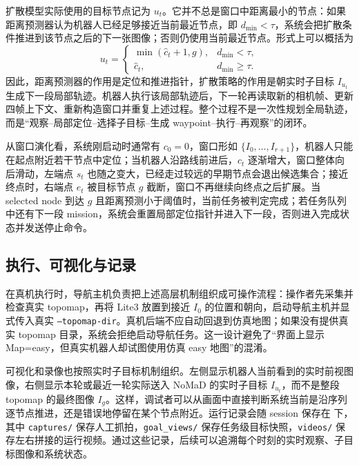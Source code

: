 扩散模型实际使用的目标节点记为 $u_t$。它并不总是窗口中距离最小的节点：如果距离预测器认为机器人已经足够接近当前最近节点，即 $d_{\min}<\tau$，系统会把扩散条件推进到该节点之后的下一张图像；否则仍使用当前最近节点。形式上可以概括为
\begin{equation}
u_t=
\begin{cases}
\min(\hat{c}_t+1,g), & d_{\min}<\tau,\\
\hat{c}_t, & d_{\min}\ge \tau.
\end{cases}
\end{equation}
因此，距离预测器的作用是定位和推进指针，扩散策略的作用是朝实时子目标 $I_{u_t}$ 生成下一段局部轨迹。机器人执行该局部轨迹后，下一轮再读取新的相机帧、更新四帧上下文、重新构造窗口并重复上述过程。整个过程不是一次性规划全局轨迹，而是“观察--局部定位--选择子目标--生成 waypoint--执行--再观察”的闭环。

从窗口演化看，系统刚启动时通常有 $c_0=0$，窗口形如 $\{I_0,\ldots,I_{r+1}\}$，机器人只能在起点附近若干节点中定位；当机器人沿路线前进后，$c_t$ 逐渐增大，窗口整体向后滑动，左端点 $s_t$ 也随之变大，已经走过较远的早期节点会退出候选集合；接近终点时，右端点 $e_t$ 被目标节点 $g$ 截断，窗口不再继续向终点之后扩展。当 selected node 到达 $g$ 且距离预测小于阈值时，当前任务被判定完成；若任务队列中还有下一段 mission，系统会重置局部定位指针并进入下一段，否则进入完成状态并发送停止命令。

\subsection{执行、可视化与记录}

在真机执行时，导航主机负责把上述高层机制组织成可操作流程：操作者先采集并检查真实 topomap，再将 Lite3 放置到接近 $I_0$ 的位置和朝向，启动导航主机并显式传入真实 \texttt{--topomap-dir}。真机后端不应自动回退到仿真地图；如果没有提供真实 topomap 目录，系统会拒绝启动导航任务。这一设计避免了“界面上显示 Map=easy，但真实机器人却试图使用仿真 easy 地图”的混淆。

可视化和录像也按照实时子目标机制组织。左侧显示机器人当前看到的实时前视图像，右侧显示本轮或最近一轮实际送入 NoMaD 的实时子目标 $I_{u_t}$，而不是整段 topomap 的最终图像 $I_g$。这样，调试者可以从画面中直接判断系统当前是沿序列逐节点推进，还是错误地停留在某个节点附近。运行记录会随 session 保存在  下，其中 \texttt{captures/} 保存人工抓拍，\texttt{goal\_views/} 保存任务级目标快照，\texttt{videos/} 保存左右拼接的运行视频。通过这些记录，后续可以追溯每个时刻的实时观察、子目标图像和系统状态。

